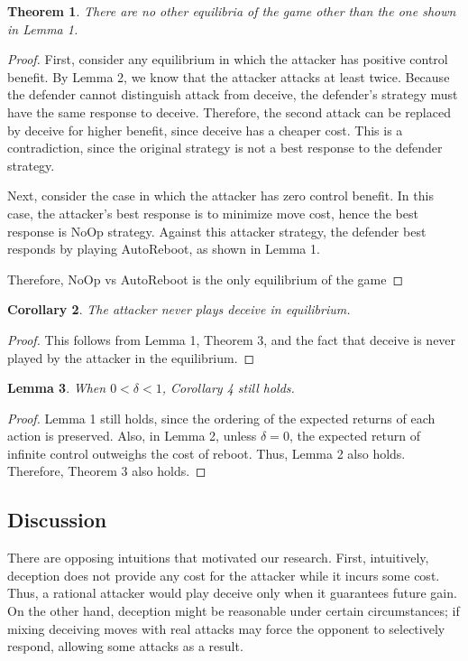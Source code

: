 \documentclass[11pt]{article}
\theoremstyle{plain}
\newtheorem{theorem}{Theorem}
\newtheorem{lemma}[theorem]{Lemma}
\newtheorem{corollary}[theorem]{Corollary}
\begin{document}
\begin{theorem} There are no other equilibria of the game other than the one shown in Lemma 1.
\end{theorem}
\begin{proof}
First, consider any equilibrium in which the attacker has positive control benefit.
By Lemma 2, we know that the attacker attacks at least twice.
Because the defender cannot distinguish {attack} from {deceive}, the defender's strategy must have the same response to {deceive}.
Therefore, the second attack can be replaced by {deceive} for higher benefit, since {deceive} has a cheaper cost.
%
%
This is a contradiction, since the original strategy is not a best response to the defender strategy.

Next, consider the case in which the attacker has zero control benefit.
In this case, the attacker's best response is to minimize move cost, hence the best response is {NoOp} strategy. Against this attacker strategy, the defender best responds by playing {AutoReboot}, as shown in Lemma 1. 

Therefore, NoOp vs {AutoReboot} is the only equilibrium of the game
\end{proof}
	
\begin{corollary} The attacker never plays {deceive} in equilibrium.
\end{corollary}
\begin{proof}
This follows from Lemma 1, Theorem 3, and the fact that {deceive} is never played by the attacker in the equilibrium.
\end{proof}

\begin{lemma} When $0<\delta<1$, Corollary 4 still holds. 
\end{lemma}
\begin{proof}
Lemma 1 still holds, since the ordering of the expected returns of each action is preserved. Also, in Lemma 2, unless $\delta = 0$, the expected return of infinite control outweighs the cost of reboot. Thus, Lemma 2 also holds. Therefore, Theorem 3 also holds.
\end{proof}

\subsection{Discussion}
There are opposing intuitions that motivated our research. First, intuitively, deception does not provide any cost for the attacker while it incurs some cost. Thus, a rational attacker would play deceive only when it guarantees future gain. On the other hand, deception might be reasonable under certain circumstances; if mixing deceiving moves with real attacks may force the opponent to selectively respond, allowing some attacks as a result.
\end{document}
